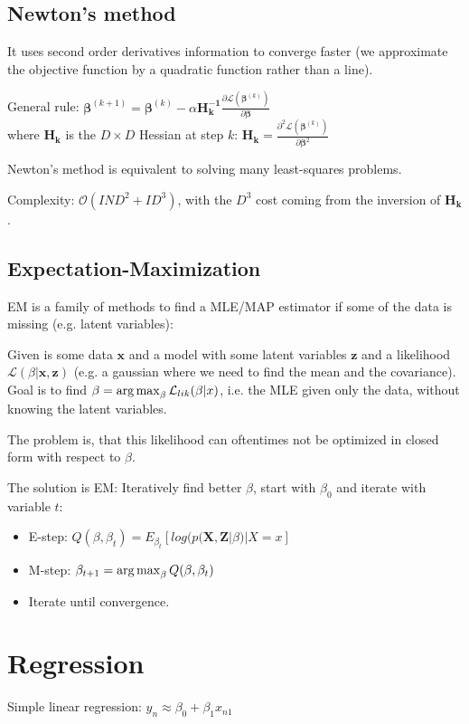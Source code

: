 \documentclass[10pt,a4paper,landscape]{article}
\providecommand{\bf}[1]{\ensuremath{\mathbf{#1}}}
\newcommand{\bbeta}{\boldsymbol\beta}
\begin{document}
\begin{multicols*}{4}
\subsection{Newton's method}
It uses second order derivatives information to converge faster (we approximate the objective function by a quadratic function rather than a line).

General rule: $\bbeta^{(k+1)} = \bbeta^{(k)} - \alpha \bf{H_k^{-1}} \frac{\partial \mathcal{L}(\bbeta^{(k)})}{\partial \bbeta}$\\
where $\bf{H_k}$ is the $D \times D$ Hessian at step $k$: $\bf{H_k} = \frac{\partial^2 \mathcal{L}(\bbeta^{(k)})}{\partial \bbeta^2}$

Newton's method is equivalent to solving many least-squares problems.

Complexity: $\mathcal{O}(I N D^2 + I D^3)$, with the $D^3$ cost coming from the inversion of $\bf{H_k}$.

\subsection{Expectation-Maximization}
EM is a family of methods to find a MLE/MAP estimator if some of the data is missing (e.g. latent variables):

Given is some data $\bf{x}$ and  a model with some latent variables $\bf{z}$ and a likelihood $\mathcal{L}(\beta | \bf{x}, \bf{z})$ (e.g. a gaussian where we need to find the mean and the covariance).
Goal is to find $\beta = \operatorname*{arg\,max}_{\beta} \mathcal{L}_{lik}(\beta | x)$, i.e. the MLE given only the data, without knowing the latent variables.

The problem is, that this likelihood can oftentimes not be optimized in closed form with respect to $\beta$.

The solution is EM: Iteratively find better $\beta$, start with $\beta_0$ and iterate with variable $t$:
\begin{itemize}
\item E-step: $Q(\beta, \beta_t) = E_{\beta_t} [ log ( p(\bf{X}, \bf{Z} | \beta) | X = x ]$
\item M-step: $\beta_{t+1} = \operatorname*{arg\,max}_\beta Q(\beta, \beta_t)$
\item Iterate until convergence.
\end{itemize}

\section{Regression}
Simple linear regression: $y_n \approx \beta_0 + \beta_1 x_{n1}$


\end{multicols*}
\end{document}
